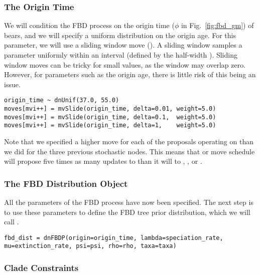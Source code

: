 \subsubsection{The Origin Time}\label{subsub:Exercise-FBD-Origin}

We will condition the FBD process on the origin time ($\phi$ in Fig.\ \ref{fig:fbd_gm}) of bears, and we will specify a uniform distribution on the origin age.
For this parameter, we will use a sliding window move ().
A sliding window samples a parameter uniformly within an interval (defined by the half-width ). 
Sliding window moves can be tricky for small values, as the window may overlap zero. 
However, for parameters such as the origin age, there is little risk of this being an issue.

{\tt \begin{snugshade*}
\begin{lstlisting}
origin_time ~ dnUnif(37.0, 55.0)
moves[mvi++] = mvSlide(origin_time, delta=0.01, weight=5.0)
moves[mvi++] = mvSlide(origin_time, delta=0.1,  weight=5.0)
moves[mvi++] = mvSlide(origin_time, delta=1,    weight=5.0)
\end{lstlisting}
\end{snugshade*}}

Note that we specified a higher move  for each of the proposals operating on  than we did for the three previous stochastic nodes.
This means that or move schedule will propose five times as many updates to  than it will to , , or . 

\subsubsection{The FBD Distribution Object}\label{subsub:Exercise-FBD-dnFBD}

All the parameters of the FBD process have now been specified. 
The next step is to use these parameters to define the FBD tree prior distribution, which we will call .

{\tt \begin{snugshade*}
\begin{lstlisting}
fbd_dist = dnFBDP(origin=origin_time, lambda=speciation_rate, mu=extinction_rate, psi=psi, rho=rho, taxa=taxa)
\end{lstlisting}
\end{snugshade*}}

\subsubsection{Clade Constraints}\label{subsub:Exercise-FBD-Constraints}

